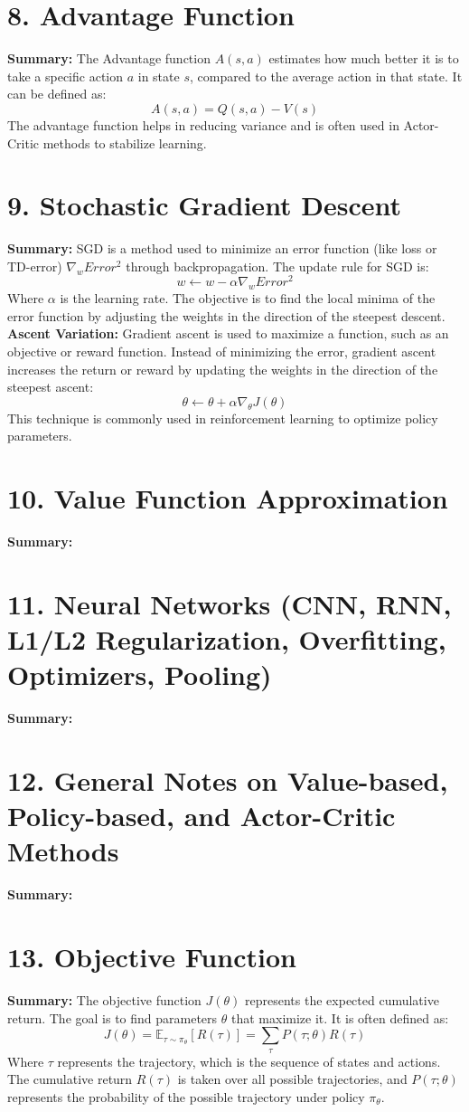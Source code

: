 \documentclass[a4paper,10pt]{article}
\begin{document}
\begin{multicols}{2}
\section*{8. Advantage Function}
\textbf{Summary:} The Advantage function \( A(s, a) \) estimates how much better it is to take a specific action \( a \) in state \( s \), compared to the average action in that state. It can be defined as:
\[
A(s, a) = Q(s, a) - V(s)
\]
The advantage function helps in reducing variance and is often used in Actor-Critic methods to stabilize learning.

\section*{9. Stochastic Gradient Descent}
\textbf{Summary:} SGD is a method used to minimize an error function (like loss or TD-error) \( \nabla_w Error^2 \) through backpropagation. The update rule for SGD is:
\[
w \leftarrow w - \alpha \nabla_w Error^2
\]
Where \( \alpha \) is the learning rate. The objective is to find the local minima of the error function by adjusting the weights in the direction of the steepest descent.
\textbf{Ascent Variation:} Gradient ascent is used to maximize a function, such as an objective or reward function. Instead of minimizing the error, gradient ascent increases the return or reward by updating the weights in the direction of the steepest ascent:
\[
\theta \leftarrow \theta + \alpha \nabla_\theta J(\theta)
\]
This technique is commonly used in reinforcement learning to optimize policy parameters.
\section*{10. Value Function Approximation}
\textbf{Summary:} 

\section*{11. Neural Networks (CNN, RNN, L1/L2 Regularization, Overfitting, Optimizers, Pooling)}
\textbf{Summary:} 

\section*{12. General Notes on Value-based, Policy-based, and Actor-Critic Methods}
\textbf{Summary:} 

\section*{13. Objective Function}
\textbf{Summary:} The objective function \( J(\theta) \) represents the expected cumulative return. The goal is to find parameters \( \theta \) that maximize it. It is often defined as:
\[
J(\theta) = \mathbb{E}_{\tau \sim \pi_\theta} [R(\tau)] = \sum_{\tau} P(\tau;\theta)R(\tau)
\]
Where \( \tau \) represents the trajectory, which is the sequence of states and actions. The cumulative return \( R(\tau) \) is taken over all possible trajectories, and \( P(\tau;\theta) \) represents the probability of the possible trajectory under policy \( \pi_\theta \).


\end{multicols}
\end{document}
